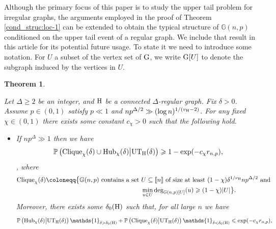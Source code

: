 \documentclass[a4paper,11pt,english,reqno]{amsart}
\numberwithin{equation}{section}
\renewcommand{\leq}{\leqslant}
\renewcommand{\geq}{\geqslant}
\newcommand{\UTH}{\textup{UT}_{\textup{H}}(\delta)}
\newcommand{\uH}{\textup{H}}
\renewcommand{\P}{\mathbb{P}}
\newcommand{\G}{\mathbb{G}}
\newcommand{\tu}[1]{\textup{#1}}
\newcommand{\set}[1]{[\![#1]\!]}
\newtheorem{theorem}{Theorem}[section]
\begin{document}
	Although the primary focus of this paper is to study the upper tail problem for irregular graphs, the arguments employed in the proof of Theorem \ref{cond_struc:loc-1} can be extended to obtain the typical structure of $\G(n,p)$ conditioned on the upper tail event of a regular graph. We include that result in this article for its potential future usage. To state it we need to introduce some notation.
	For $U$ a subset of the vertex set of $\tu{G}$, we write $\tu{G}[U]$ to denote the subgraph induced by the vertices in $U$. %
	\begin{theorem}
		\label{thm: cond struc regular graph}
		
		Let $\Delta\geq 2 $ be an integer, and $\uH$ be a connected $\Delta$-regular graph. Fix $\delta>0$. Assume $p\in (0,1)$ satisfy $p \ll 1$ and $np^{\Delta/2}\gg (\log n)^{1/(v_{\uH}-2)}$. For any fixed $\chi\in (0,1)$ there exists some constant $c_\chi > 0$ such that the following hold.
		
		\begin{itemize}
			\item[(a)] If $np^{\Delta}\gg 1$ then we have
			\begin{equation}\label{eq:clique-hub}
				\P\left( \tu{Clique}_{\chi}(\delta)\cup \tu{Hub}_{\chi}(\delta)\big| \UTH\right) \geq 1 - \exp(-c_\chi r_{n,p}),
			\end{equation}
			, where
			\begin{equation}\label{eq:clique-or-hub}
				\begin{aligned}
					\tu{Clique}_{\chi}(\delta) \coloneqq \big\{\G(n,p) \tu{ contains a set }&U\subseteq \set{n} \tu{ of size at least }(1-\chi)\delta^{1/v_{\uH}}np^{\Delta/2}\tu{ and }\\
					&\min_{u\in U} \tu{deg}_{\G(n,p)[U]} (u)\geq (1-\chi) |U|\big\}.
				\end{aligned}
			\end{equation}
			Moreover, there exists some $\delta_0(\tu{H})$ such that, 
			for all large $n$ %
			we have
			\[
			\P\left(  \tu{Hub}_{\chi}(\delta)\big| \UTH\right) {\mathds{1}}_{\delta > \delta_0(\tu{H})}+ \P\left(  \tu{Clique}_{\chi}(\delta)\big| \UTH\right){\mathds{1}}_{\delta < \delta_0(\tu{H})}  \leq \exp(-c_\chi r_{n,p}),
			\]
			

\end{itemize}
\end{theorem}
\end{document}
